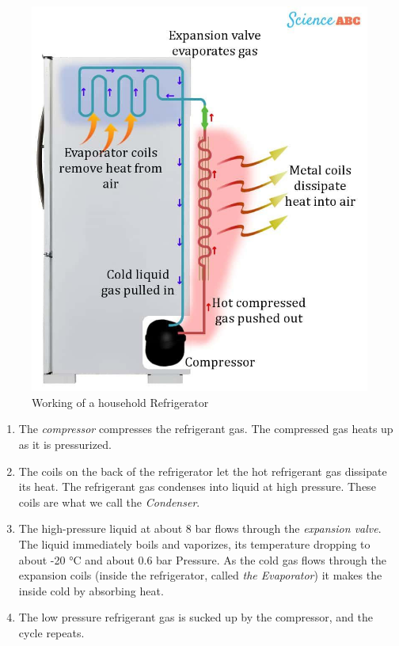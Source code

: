 \documentclass[11pt]{article}
\begin{document}
\begin{figure}[H]
	\centering
	\includegraphics[scale=0.3]{household refrigerator.jpg}
	\caption{Working of a household Refrigerator \cite{household refrigerator}}
	\label{fig:Working of a Refrigerator}
	
\end{figure}



\begin{enumerate}
\item The \textit{compressor} compresses the refrigerant gas. The compressed gas heats up as it is pressurized.
\item The coils on the back of the refrigerator let the hot refrigerant gas dissipate its heat. The refrigerant gas condenses into liquid at high pressure. These coils are what we call the\textit{ Condenser}.
\item The high-pressure liquid at about 8 bar flows through the \textit{expansion valve}.
The liquid immediately boils and vaporizes, its temperature dropping to about -20 °C and about 0.6 bar Pressure. As the cold gas flows through the expansion coils (inside the refrigerator, called \textit{the Evaporator}) it makes the inside cold by absorbing heat.
\item The low pressure refrigerant gas is sucked up by the compressor, and the cycle repeats.
\end{enumerate}
\end{document}
